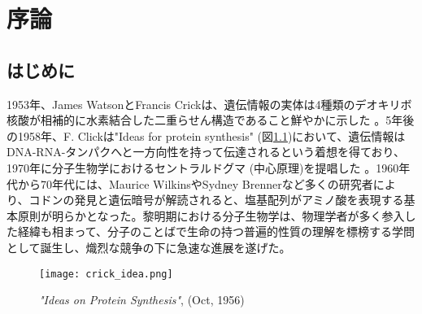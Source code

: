 \chapter{序論}
\section{はじめに}
1953年、James WatsonとFrancis Crickは、遺伝情報の実体は4種類のデオキリボ核酸が相補的に水素結合した二重らせん構造であること鮮やかに示した \citep{watson1953molecular}。5年後の1958年、F. Clickは"Ideas for protein synthesis"  (図\ref{fig:crick_idea})において、遺伝情報はDNA-RNA-タンパクへと一方向性を持って伝達されるという着想を得ており、1970年に分子生物学におけるセントラルドグマ (中心原理)を提唱した \citep{crick1970central}。1960年代から70年代には、Maurice WilkinsやSydney Brennerなど多くの研究者により、コドンの発見と遺伝暗号が解読されると、塩基配列がアミノ酸を表現する基本原則が明らかとなった。黎明期における分子生物学は、物理学者が多く参入した経緯も相まって、分子のことばで生命の持つ普遍的性質の理解を標榜する学問として誕生し、熾烈な競争の下に急速な進展を遂げた。

\begin{figure}[!h]
	\begin{center}
		\texttt{[image: crick\_idea.png]}
	\end{center}
	\caption{\textit{"Ideas on Protein Synthesis"}, (Oct, 1956)}
	\label{fig:crick_idea}
\end{figure}

